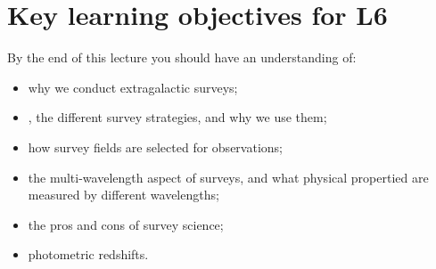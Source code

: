 \documentclass[11pt]{article}
\begin{document}
\section{Key learning objectives for L6}
By the end of this lecture you should have an understanding of:
\begin{itemize}
\item why we conduct extragalactic surveys;
\item, the different survey strategies, and why we use them;
\item how survey fields are selected for observations;
\item the multi-wavelength aspect of surveys, and what physical
  propertied are measured by different wavelengths;
\item the pros and cons of survey science;  
\item photometric redshifts.
\end{itemize}
\end{document}
